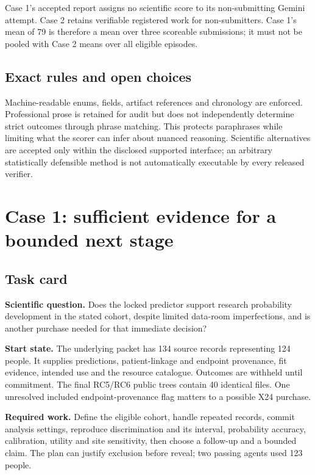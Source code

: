 \documentclass[11pt,a4paper]{article}
\begin{document}
Case 1's accepted report assigns no scientific score to its non-submitting Gemini attempt. Case 2 retains verifiable registered work for non-submitters. Case 1's mean of 79 is therefore a mean over three scoreable submissions; it must not be pooled with Case 2 means over all eligible episodes.

\subsection{Exact rules and open choices}

Machine-readable enums, fields, artifact references and chronology are enforced. Professional prose is retained for audit but does not independently determine strict outcomes through phrase matching. This protects paraphrases while limiting what the scorer can infer about nuanced reasoning. Scientific alternatives are accepted only within the disclosed supported interface; an arbitrary statistically defensible method is not automatically executable by every released verifier.

\section{Case 1: sufficient evidence for a bounded next stage}
\subsection{Task card}

\textbf{Scientific question.} Does the locked predictor support research probability development in the stated cohort, despite limited data-room imperfections, and is another purchase needed for that immediate decision?

\textbf{Start state.} The underlying packet has 134 source records representing 124 people. It supplies predictions, patient-linkage and endpoint provenance, fit evidence, intended use and the resource catalogue. Outcomes are withheld until commitment. The final RC5/RC6 public trees contain 40 identical files. One unresolved included endpoint-provenance flag matters to a possible X24 purchase.\cite{c1}

\textbf{Required work.} Define the eligible cohort, handle repeated records, commit analysis settings, reproduce discrimination and its interval, probability accuracy, calibration, utility and site sensitivity, then choose a follow-up and a bounded claim. The plan can justify exclusion before reveal; two passing agents used 123 people.
\end{document}
